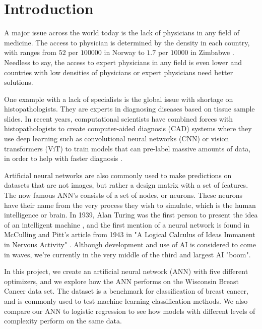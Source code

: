 \section{Introduction}\label{sec:introduction}

A major issue across the world today is the lack of physicians in any field of medicine. The access to physician is determined by the 
density in each country, with ranges from $52$ per $10 0000$ in Norway to $1.7$ per $10 000$ in Zimbabwe \cite{who_physicians}. Needless to say, 
the access to expert physicians in any field is even lower and countries with low densities of physicians or expert physicians need better
solutions. 

One example with a lack of specialists is the global issue with shortage on histopathologists. They are experts in diagnosing 
diseases based on tissue sample slides. In recent years, computational scientists have combined forces with histopathologists to create computer-aided 
diagnosis (CAD) systems where they use deep learning such as convolutional neural networks (CNN) or vision transformers (ViT)
to train models that can pre-label massive amounts of data, in order to help with faster diagnosis \cite{histopath_AI}.

Artificial neural networks are also commonly used to make predictions on datasets that are not images, but rather a design matrix with a set of features.
The now famous ANN's consists of a set of nodes, or neurons. These neurons have their name from the very process they wish to simulate, which is the
human intelligence or brain. In 1939, Alan Turing was the first person to present the idea of an intelligent machine \cite{turing_36}, and the first mention of a 
neural network is found in McCulling and Pitt's article from 1943 in "A Logical Calculus of Ideas Immanent in Nervous Activity" \cite{mccu_pitt}. 
Although development and use of AI is considered to come in waves, we're currently in the very middle of the third and largest AI "boom". 

In this project, we create an artificial neural network (ANN) with five different optimizers, and we explore how the ANN performs on the 
Wisconsin Breast Cancer data set. The dataset is a benchmark for classification of breast cancer, and is commonly used to test machine learning 
classification methods. We also compare our ANN to logistic regression to see how models with different levels of complexity perform on the same data. 


